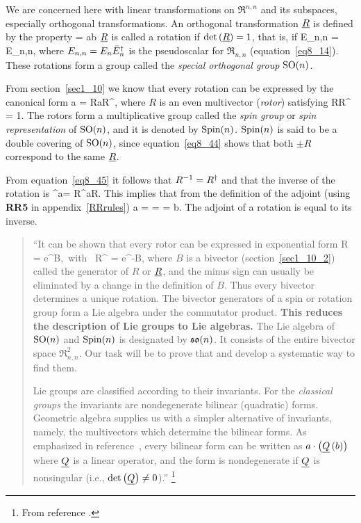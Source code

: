 We are concerned here with linear transformations on $\Re^{n,n}$ and its subspaces, especially orthogonal
transformations.  An orthogonal transformation $\underline{R}$ is defined by the property
\be
	\cdot{} = a\cdot b
\ee
$\underline{R}$ is called a rotation if ${\det}\left ( {\underline{R}} \right )=1$, that is, if 
\be
	E_{n,n} = E_{n,n},
\ee
where $E_{n,n}=E_{n}\bar{E}_{n}^{\dagger}$ is the pseudoscalar for $\Re_{n,n}$ (equation~\ref{eq8_14}).  These
rotations form a group called the {\em special orthogonal group} ${\mbox{SO}\!}\left ( {n} \right )$.

From section~\ref{sec1_10} we know that every rotation can be expressed by the canonical form
\be\label{eq8_44}
	a = RaR^{\R},
\ee
where $R$ is an even multivector ({\em rotor}) satisfying
\be\label{eq8_45}
	RR^{\R} = 1.
\ee
The rotors form a multiplicative group called the {\em spin group} or {\em spin representation} of ${\mbox{SO}\!}\left ( {n} \right )$,
and it is denoted by ${\mbox{Spin}\!}\left ( {n} \right )$.  ${\mbox{Spin}\!}\left ( {n} \right )$ is said to be a double covering of ${\mbox{SO}\!}\left ( {n} \right )$, since 
equation~\ref{eq8_44} shows that both $\pm R$ correspond to the same $\underline{R}$.

From equation~\ref{eq8_45} it follows that $R^{-1}=R^{\dagger}$ and that the inverse of the rotation is
\be
	^{\R}a= R^{\R}aR.
\ee
This implies that from the definition of the adjoint (using {\bf RR5} in appendix~\ref{RRrules})
\be\label{eq8_47}
	a\cdot{} =  =  = b\cdot{}. 
\ee
The adjoint of a rotation is equal to its inverse.

\begin{quotation}
``It can be shown that every rotor can be expressed in exponential form
\be
	R = \pm e^{\shalf B},\mbox{ with } R^{\R} = \pm e^{-\shalf B},
\ee
where $B$ is a bivector (section~\ref{sec1_10_2}) called the generator of $R$ or $\underline{R}$, and the minus
sign can usually be eliminated by a change in the definition of $B$.  Thus every bivector determines a unique
rotation.  The bivector generators of a spin or rotation group form a Lie algebra under the commutator product. 
{\bf This reduces the description of Lie groups to Lie algebras.}  The Lie algebra of ${\mbox{SO}\!}\left ( {n} \right )$ and 
${\mbox{Spin}\!}\left ( {n} \right )$ is designated by ${\mathfrak{so}\!}\left ( {n} \right )$.  It consists of the entire bivector space $\Re_{n,n}^{2}$. Our task
will be to prove that and develop a systematic way to find them.

Lie groups are classified according to their invariants.  For the {\em classical groups} the invariants are
nondegenerate bilinear (quadratic) forms. Geometric algebra supplies us with a simpler alternative of 
invariants, namely, the multivectors which determine the bilinear forms.  As emphasized in reference~\cite{H&S},
every bilinear form can be written as $a\cdot\left ( {{\underline{Q}}\left ( {b} \right )} \right )$ where $\underline{Q}$ is a linear operator, 
and the form is nondegenerate if $\underline{Q}$ is nonsingular (i.e., ${\det}\left ( {\underline{Q}} \right )\ne 0$).''
\footnote{From reference \cite{DHS&VA}.} 
\end{quotation}

